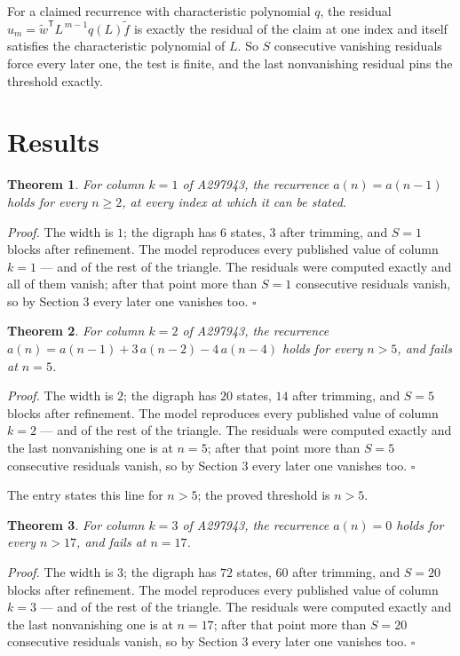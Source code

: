 \documentclass[11pt]{article}
\newtheorem{theorem}{Theorem}
\theoremstyle{definition}
\begin{document}
For a claimed recurrence with characteristic polynomial $q$, the residual $u_m = \tilde w^{\mathsf T}L^{\,m-1}q(L)\tilde f$ is exactly the residual of the claim at one index and itself satisfies the characteristic polynomial of $L$. So $S$ consecutive vanishing residuals force every later one, the test is finite, and the last nonvanishing residual pins the threshold exactly.

\section{Results}

\begin{theorem} For column $k = 1$ of A297943, the recurrence $a(n) = a(n-1)$ holds for every $n \ge 2$, at every index at which it can be stated.\end{theorem}

{\itshape Proof.} The width is $1$; the digraph has $6$ states, $3$ after trimming, and $S = 1$ blocks after refinement. The model reproduces every published value of column $k = 1$ --- and of the rest of the triangle. The residuals were computed exactly and all of them vanish; after that point more than $S = 1$ consecutive residuals vanish, so by Section 3 every later one vanishes too. $\square$

\begin{theorem} For column $k = 2$ of A297943, the recurrence $a(n) = a(n-1) + 3\,a(n-2) - 4\,a(n-4)$ holds for every $n > 5$, and fails at $n = 5$.\end{theorem}

{\itshape Proof.} The width is $2$; the digraph has $20$ states, $14$ after trimming, and $S = 5$ blocks after refinement. The model reproduces every published value of column $k = 2$ --- and of the rest of the triangle. The residuals were computed exactly and the last nonvanishing one is at $n = 5$; after that point more than $S = 5$ consecutive residuals vanish, so by Section 3 every later one vanishes too. $\square$

The entry states this line for $n > 5$; the proved threshold is $n > 5$.

\begin{theorem} For column $k = 3$ of A297943, the recurrence $a(n) = 0$ holds for every $n > 17$, and fails at $n = 17$.\end{theorem}

{\itshape Proof.} The width is $3$; the digraph has $72$ states, $60$ after trimming, and $S = 20$ blocks after refinement. The model reproduces every published value of column $k = 3$ --- and of the rest of the triangle. The residuals were computed exactly and the last nonvanishing one is at $n = 17$; after that point more than $S = 20$ consecutive residuals vanish, so by Section 3 every later one vanishes too. $\square$
\end{document}
